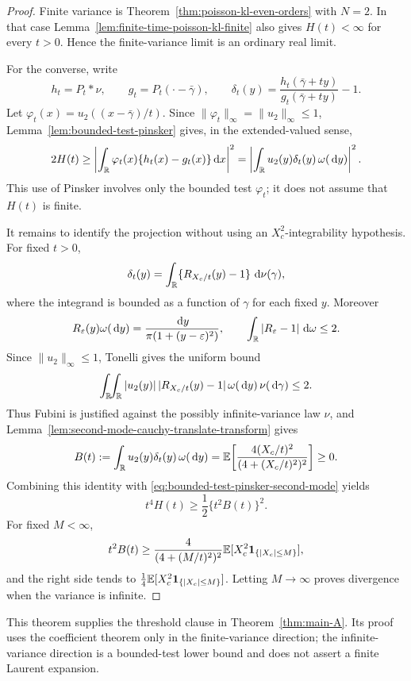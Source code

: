 \begin{proof}
Finite variance is Theorem~\ref{thm:poisson-kl-even-orders} with \(N=2\).
In that case Lemma~\ref{lem:finite-time-poisson-kl-finite} also gives
\(H(t)<\infty\) for every \(t>0\).  Hence the finite-variance limit is an
ordinary real limit.

For the converse, write
\[
h_t=P_t*\nu,\qquad g_t=P_t(\cdot-\bar{\gamma}),\qquad
\delta_t(y)=\frac{h_t(\bar{\gamma}+ty)}{g_t(\bar{\gamma}+ty)}-1 .
\]
Let \(\varphi_t(x)=u_2((x-\bar{\gamma})/t)\).  Since
\(\|\varphi_t\|_\infty=\|u_2\|_\infty\le1\),
Lemma~\ref{lem:bounded-test-pinsker} gives, in the
extended-valued sense,
\begin{equation}\label{eq:bounded-test-pinsker-second-mode}
2H(t)\ge
\left|
\int_{\mathbb{R}}\varphi_t(x)\{h_t(x)-g_t(x)\}\,\mathrm{d} x
\right|^2
=
\left|
\int_{\mathbb{R}}u_2(y)\delta_t(y)\,\omega(\,\mathrm{d} y)
\right|^2 .
\end{equation}
This use of Pinsker involves only the bounded test \(\varphi_t\); it does not
assume that \(H(t)\) is finite.

It remains to identify the projection without using an \(X_c^2\)-integrability
hypothesis.  For fixed \(t>0\),
\[
\delta_t(y)=\int_{\mathbb{R}}\{R_{X_c/t}(y)-1\}\,\,\mathrm{d}\nu(\gamma),
\]
where the integrand is bounded as a function of \(\gamma\) for each fixed
\(y\).  Moreover
\[
R_\varepsilon(y)\omega(\,\mathrm{d} y)
=\frac{\,\mathrm{d} y}{\pi(1+(y-\varepsilon)^2)},
\qquad
\int_{\mathbb{R}}|R_\varepsilon-1|\,\,\mathrm{d}\omega\le2 .
\]
Since \(\|u_2\|_\infty\le1\), Tonelli gives the uniform bound
\[
\int_{\mathbb{R}}\!\!\int_{\mathbb{R}}
|u_2(y)|\,|R_{X_c/t}(y)-1|\,\omega(\,\mathrm{d} y)\,\nu(\,\mathrm{d}\gamma)
\le2 .
\]
Thus Fubini is justified against the possibly infinite-variance law \(\nu\),
and Lemma~\ref{lem:second-mode-cauchy-translate-transform} gives
\[
B(t):=
\int_{\mathbb{R}}u_2(y)\delta_t(y)\,\omega(\,\mathrm{d} y)
=
\mathbb{E}\!\left[\frac{4(X_c/t)^2}{(4+(X_c/t)^2)^2}\right]\ge0 .
\]
Combining this identity with \eqref{eq:bounded-test-pinsker-second-mode}
yields
\[
t^4H(t)\ge\frac12\{t^2B(t)\}^2 .
\]
For fixed \(M<\infty\),
\[
t^2B(t)\ge
\frac{4}{(4+(M/t)^2)^2}
\mathbb{E}[X_c^2\mathbf1_{\{|X_c|\le M\}}],
\]
and the right side tends to
\(\frac14\mathbb{E}[X_c^2\mathbf1_{\{|X_c|\le M\}}]\).  Letting
\(M\to\infty\) proves divergence when the variance is infinite.
\end{proof}

\begin{remark}
This theorem supplies the threshold clause in Theorem~\ref{thm:main-A}.
Its proof uses the coefficient theorem only in the finite-variance direction;
the infinite-variance direction is a bounded-test lower bound and does not
assert a finite Laurent expansion.
\end{remark}

